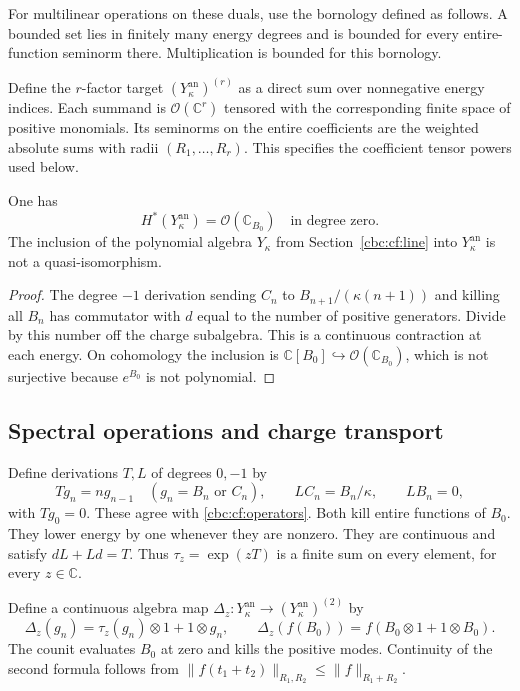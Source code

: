 For multilinear operations on these duals, use the bornology defined
as follows. A bounded set lies in finitely many energy degrees and is
bounded for every entire-function seminorm there. Multiplication
is bounded for this bornology.

Define the \(r\)-factor target \((Y^{\mathrm{an}}_\kappa)^{(r)}\)
as a direct sum over nonnegative energy indices. Each summand is
\(\mathcal O(\mathbb C^r)\) tensored with the corresponding finite space
of positive monomials. Its seminorms on the entire
coefficients are the weighted absolute sums with radii
\((R_1,\ldots,R_r)\). This specifies the coefficient tensor powers
used below.

\begin{corollary}\label{cbc:rc:an:cor:cohomology}
One has
\[
 H^*(Y^{\mathrm{an}}_\kappa)=\mathcal O(\mathbb C_{B_0})
 \quad\text{in degree zero}.
\]
The inclusion of the polynomial algebra \(Y_\kappa\) from
Section~\ref{cbc:cf:line} into \(Y^{\mathrm{an}}_\kappa\) is not a
quasi-isomorphism.
\end{corollary}
\begin{proof}
The degree \(-1\) derivation sending
\(C_n\) to \(B_{n+1}/(\kappa(n+1))\) and killing all
\(B_n\) has commutator with \(d\) equal to the number of positive
generators. Divide by this number off the charge subalgebra. This is
a continuous contraction at each energy. On cohomology the inclusion
is \(\mathbb C[B_0]\hookrightarrow\mathcal O(\mathbb C_{B_0})\),
which is not surjective because \(e^{B_0}\) is not polynomial.
\end{proof}

\subsection{Spectral operations and charge transport}

Define derivations \(T,L\) of degrees \(0,-1\) by
\begin{equation}\label{cbc:rc:an:eq:cartan}
 Tg_n=ng_{n-1}\quad(g_n=B_n\text{ or }C_n),\qquad
 LC_n=B_n/\kappa,\qquad LB_n=0,
\end{equation}
with \(Tg_0=0\). These agree with \eqref{cbc:cf:operators}. Both kill entire functions of \(B_0\).
They lower energy by one whenever they are nonzero. They are
continuous and satisfy \(dL+Ld=T\). Thus
\(\tau_z=\exp(zT)\) is a finite sum on every element, for every
\(z\in\mathbb C\).

Define a continuous algebra map
\(\Delta_z:Y^{\mathrm{an}}_\kappa\to
(Y^{\mathrm{an}}_\kappa)^{(2)}\) by
\begin{equation}\label{cbc:rc:an:eq:coproduct}
 \Delta_z(g_n)=\tau_z(g_n)\otimes1+1\otimes g_n,
 \qquad \Delta_z(f(B_0))=f(B_0\otimes1+1\otimes B_0).
\end{equation}
The counit evaluates \(B_0\) at zero and kills the positive modes.
Continuity of the second formula follows from
\(\|f(t_1+t_2)\|_{R_1,R_2}\leq\|f\|_{R_1+R_2}\).

